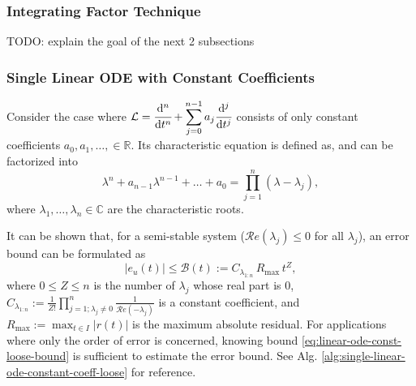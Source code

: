 \documentclass{article}
\newcommand{\dnt}[2]{\cfrac{\mathrm{d}^{#1} #2}{\mathrm{d} t^{#1}}}
\newcommand{\Err}{e}
\newcommand{\Bound}{\mathcal{B}}
\renewcommand{\L}{\mathcal{L}}
\renewcommand{\Re}[1]{\mathcal{R}e\left(#1\right)}
\begin{document}
\subsubsection{Integrating Factor Technique}
    TODO: explain the goal of the next 2 subsections
\subsubsection{Single Linear ODE with Constant Coefficients}\label{section:single-linear-ode-with-constant-coefficients}
    Consider the case where $\displaystyle \L = \dnt{n}{} + \sum_{j=0}^{n - 1} a_j \dnt{j}{}$ consists of only constant coefficients $a_0, a_1, \dots, \in \mathbb{R}$.
    Its characteristic equation is defined as, and can be factorized into
    \begin{equation} \label{eq:single-linear-ode-characteristic-polynomial-factorization}
        \lambda^n + a_{n-1}\lambda^{n-1} + \dots + a_0 = \prod_{j=1}^{n}(\lambda - \lambda_j),
    \end{equation}
    where $\lambda_1, \dots, \lambda_n \in \mathbb{C}$ are the characteristic roots. 

    It can be shown that, for a semi-stable system ($\Re{\lambda_j} \leq 0$ for all $\lambda_j$), an error bound can be formulated as
    \begin{equation} \label{eq:linear-ode-const-loose-bound}
        \left|\Err_u(t)\right| \leq \Bound(t) := C_{\lambda_{1:n}}\, R_{\max}\, t^{Z},
    \end{equation}
    where $0\leq Z \leq n$ is the number of $\lambda_j$ whose real part is $0$, $\displaystyle C_{\lambda_{1:n}} := \frac{1}{Z!}\prod_{j=1; \lambda_j\neq 0}^{n} \frac{1}{\Re{-\lambda_j}}$ is a constant coefficient, and $\displaystyle R_{\max}:=\max_{t\in I} |r(t)|$ is the maximum absolute residual. 
    For applications where only the order of error is concerned, knowing bound \ref{eq:linear-ode-const-loose-bound} is sufficient to estimate the error bound. See Alg. \ref{alg:single-linear-ode-constant-coeff-loose} for reference.
\end{document}
